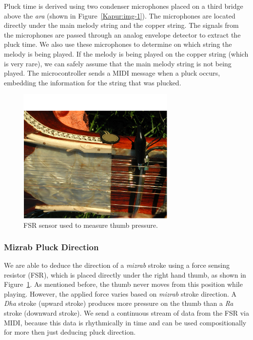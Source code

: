 Pluck time is derived using two condenser microphones placed on a third bridge
above the \textit{ara }(shown in Figure~\ref{Kapur:img-1}). The microphones are located directly
under the main melody string and the copper string. The signals from the
microphones are passed through an analog envelope detector to extract the pluck
time. We also use these microphones to determine on which string the melody is
being played. If the melody is being played on the copper\textit{ }string (which
is very rare), we can safely assume that the main melody string is not being
played. The microcontroller sends a MIDI message when a pluck occurs, embedding
the information for the string that was plucked.

\begin{figure}[t]
\centering
\includegraphics[width=78mm]{img-2-eps-converted-to-crop.pdf}      
\caption{FSR sensor used to measure thumb pressure.}
\label{Kapur:img-2}       %
\end{figure}


\subsubsection{Mizrab Pluck Direction}

We are able to deduce the direction of a \textit{mizrab} stroke using a force
sensing resistor (FSR), which is placed directly under the right hand thumb, as
shown in Figure~\ref{Kapur:img-2}. As mentioned before, the thumb never moves from this position
while playing. However, the applied force varies based on \textit{mizrab} stroke
direction. A \textit{Dha }stroke (upward stroke) produces more pressure on the
thumb than a \textit{Ra} stroke (downward stroke). We send a continuous stream of
data from the FSR via MIDI, because this data is rhythmically in time and can be
used compositionally for more then just deducing pluck direction.


